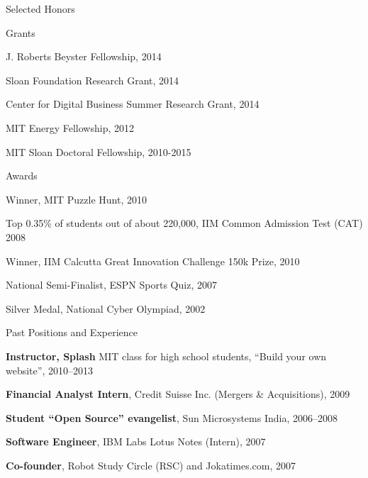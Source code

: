 \documentclass{resume} %
\begin{document}
\begin{rSection}{Selected Honors}

\begin{rSubsection}{Grants}{}{}{}
\item J. Roberts Beyster Fellowship, 2014
\item Sloan Foundation Research Grant, 2014
\item Center for Digital Business Summer Research Grant, 2014
\item MIT Energy Fellowship, 2012
\item MIT Sloan Doctoral Fellowship, 2010-2015
\end{rSubsection}

\begin{rSubsection}{Awards}{}{}{}
\item Winner, MIT Puzzle Hunt, 2010
\item Top 0.35\% of students out of about 220,000, IIM Common Admission Test (CAT) 2008
\item Winner, IIM Calcutta Great Innovation Challenge 150k Prize, 2010
\item National Semi-Finalist, ESPN Sports Quiz, 2007
\item Silver Medal, National Cyber Olympiad, 2002
\end{rSubsection}

\end{rSection}


\begin{rSection}{Past Positions and Experience}

\begin{rSubsection}{}{}{}{}

\item \textbf{Instructor, Splash} MIT class for high school students, ``Build your own website'', 2010--2013
\item \textbf{Financial Analyst Intern}, Credit Suisse Inc. (Mergers \& Acquisitions), 2009
\item \textbf{Student ``Open Source'' evangelist}, Sun Microsystems India, 2006--2008
\item \textbf{Software Engineer}, IBM Labs Lotus Notes (Intern), 2007
\item \textbf{Co-founder}, Robot Study Circle (RSC) and Jokatimes.com, 2007

\end{rSubsection}

\end{rSection}
\end{document}
